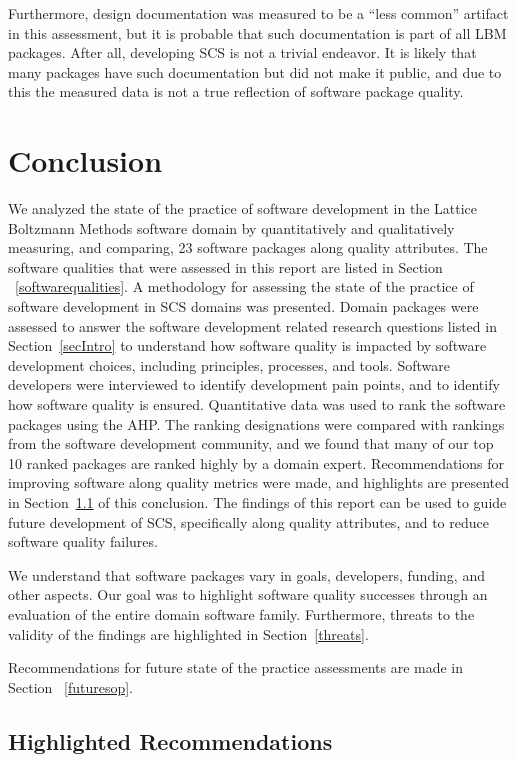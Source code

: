 \documentclass[final, 3p, times, authoryear]{elsarticle}
\begin{document}
Furthermore, design documentation was measured to be a ``less common'' artifact
in this assessment, but it is probable that such documentation is part of all
LBM packages. After all, developing SCS is not a trivial endeavor. It is likely
that many packages have such documentation but did not make it public, and due
to this the measured data is not a true reflection of software package quality.

\section{Conclusion} \label{conclusion}

We analyzed the state of the practice of software development in the Lattice
Boltzmann Methods software domain by quantitatively and qualitatively measuring,
and comparing, 23 software packages along quality attributes. The software
qualities that were assessed in this report are listed in Section
~\ref{softwarequalities}. A methodology for assessing the state of the practice
of software development in SCS domains was presented. Domain packages were
assessed to answer the software development related research questions listed in
Section~\ref{secIntro} to understand how software quality is impacted by software
development choices, including principles, processes, and tools. Software
developers were interviewed to identify development pain points, and to identify
how software quality is ensured. Quantitative data was used to rank the software
packages using the AHP. The ranking designations were compared with rankings
from the software development community, and we found that many of our top 10
ranked packages are ranked highly by a domain expert. Recommendations for
improving software along quality metrics were made, and highlights are presented
in Section~\ref{highlightedrecommendations} of this conclusion. The findings of
this report can be used to guide future development of SCS, specifically along
quality attributes, and to reduce software quality failures.

We understand that software packages vary in goals, developers, funding, and
other aspects. Our goal was to highlight software quality successes through an
evaluation of the entire domain software family. Furthermore, threats to the
validity of the findings are highlighted in Section~\ref{threats}. 

Recommendations for future state of the practice assessments are made in Section
~\ref{futuresop}.

\subsection{Highlighted Recommendations} \label{highlightedrecommendations}
\end{document}

